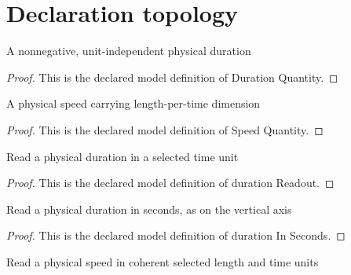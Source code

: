 \section{Declaration topology}
\begin{definition}
  \label{def:physics:phyx-mini-0599:phyxminiproblems-problemphyxmini0599-durationquantity}
  A nonnegative, unit-independent physical duration
\end{definition}
\begin{proof}
  This is the declared model definition of Duration Quantity.
\end{proof}
\begin{definition}
  \label{def:physics:phyx-mini-0599:phyxminiproblems-problemphyxmini0599-speedquantity}
  A physical speed carrying length-per-time dimension
\end{definition}
\begin{proof}
  This is the declared model definition of Speed Quantity.
\end{proof}
\begin{definition}
  \label{def:physics:phyx-mini-0599:phyxminiproblems-problemphyxmini0599-durationreadout}
  Read a physical duration in a selected time unit
\end{definition}
\begin{proof}
  This is the declared model definition of duration Readout.
\end{proof}
\begin{definition}
  \label{def:physics:phyx-mini-0599:phyxminiproblems-problemphyxmini0599-durationinseconds}
  Read a physical duration in seconds, as on the vertical axis
\end{definition}
\begin{proof}
  This is the declared model definition of duration In Seconds.
\end{proof}
\begin{definition}
  \label{def:physics:phyx-mini-0599:phyxminiproblems-problemphyxmini0599-speedreadout}
  Read a physical speed in coherent selected length and time units
\end{definition}
